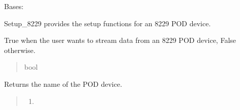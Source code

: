 \documentclass[letterpaper,10pt,english]{sphinxmanual}
\begin{document}
\begin{fulllineitems}
\label{\detokenize{Setup.SetupOneDevice:Setup.SetupOneDevice.Setup_8229.Setup8229}}
\pysigstartsignatures
{}
\pysigstopsignatures
\sphinxAtStartPar
Bases: {\hyperref[\detokenize{Setup.SetupOneDevice:Setup.SetupOneDevice.Setup_PodInterface.SetupInterface}]{}}

\sphinxAtStartPar
Setup\_8229 provides the setup functions for an 8229 POD device.

\begin{fulllineitems}
\label{\detokenize{Setup.SetupOneDevice:Setup.SetupOneDevice.Setup_8229.Setup8229._streamMode}}
\pysigstartsignatures
{}
\pysigstopsignatures
\sphinxAtStartPar
True when the user wants to stream data from an 8229 POD             device, False otherwise.
\begin{quote}\begin{description}
\sphinxAtStartPar
bool

\end{description}\end{quote}

\end{fulllineitems}


\begin{fulllineitems}
\label{\detokenize{Setup.SetupOneDevice:Setup.SetupOneDevice.Setup_8229.Setup8229.GetDeviceName}}
\pysigstartsignatures
{}
\pysigstopsignatures
\sphinxAtStartPar
Returns the name of the POD device.
\begin{quote}\begin{description}
\sphinxAtStartPar
\begin{enumerate}
%
\setcounter{enumi}{8228}
\item {} 
\end{enumerate}



\end{description}
\end{quote}
\end{fulllineitems}
\end{fulllineitems}
\end{document}
